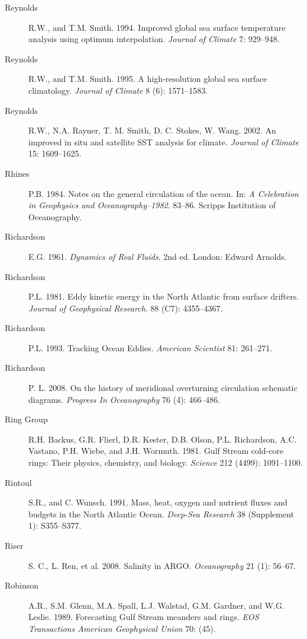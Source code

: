 \begin{description}
\item [Reynolds]R.W., and T.M. Smith. 1994. Improved global sea surface
temperature analysis using optimum interpolation. \textit{Journal of Climate} 7:
929--948.

\item [Reynolds]R.W., and T.M. Smith. 1995. A high-resolution global sea surface 
climatology. \textit{Journal of Climate} 8 (6): 1571--1583.

\item [Reynolds]R.W., N.A. Rayner, T. M. Smith, D. C. Stokes, W. Wang. 2002. An improved in situ and satellite SST analysis for climate. \textit{Journal of Climate} 15: 1609--1625.

\item [Rhines]P.B. 1984. Notes on the general circulation of the ocean. In:
\textit{A Celebration in Geophysics and Oceanography--1982}. 83--86. Scripps
Institution of Oceanography.

\item [Richardson]E.G. 1961. \textit{Dynamics of Real Fluids}. 2nd ed. London:
Edward Arnolds.

\item [Richardson]P.L. 1981. Eddy kinetic energy in the North Atlantic
from surface drifters. \textit{Journal of Geophysical Research}. 88 (C7): 4355--4367.

\item [Richardson]P.L. 1993. Tracking Ocean Eddies. \textit{American Scientist}
81: 261--271.

\item [Richardson]P. L. 2008. On the history of meridional overturning circulation schematic diagrams. \textit{Progress In Oceanography} 76 (4): 466--486.

\item [Ring Group]R.H. Backus, G.R. Flierl, D.R. Kester, D.B. Olson, P.L. Richardson, A.C. Vastano, P.H. Wiebe, and J.H. Wormuth. 1981. Gulf Stream cold-core rings: Their physics, chemistry, and
biology. \textit{Science} 212 (4499): 1091--1100.

\item [Rintoul]S.R., and C. Wunsch. 1991. Mass, heat, oxygen and nutrient
fluxes and budgets in the North Atlantic Ocean. \textit{Deep-Sea Research} 38
(Supplement 1): S355--S377.

\item [Riser]S. C., L. Ren, et al. 2008. Salinity in ARGO. \textit{Oceanography} 21 (1): 56--67.

\item [Robinson]A.R., S.M. Glenn, M.A. Spall, L.J. Walstad, G.M. Gardner, and
W.G. Leslie. 1989. Forecasting Gulf Stream meanders and rings. \textit{EOS
Transactions American Geophysical Union} 70: (45).


\end{description}
